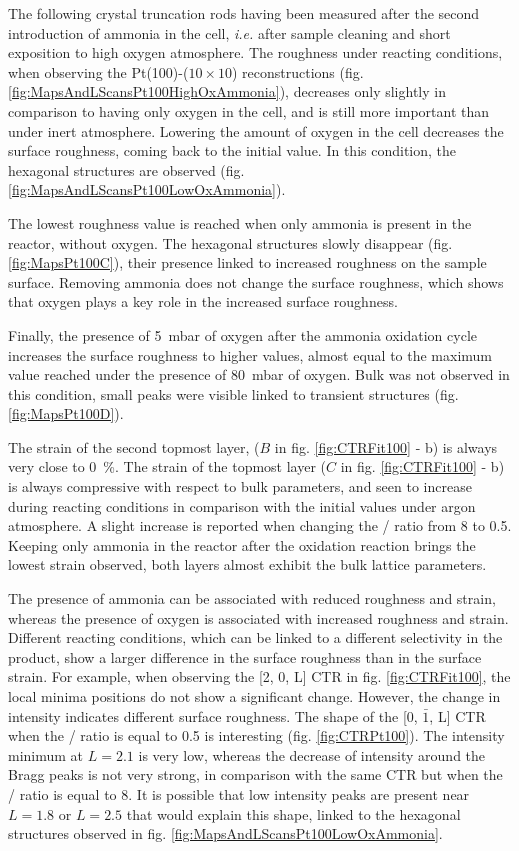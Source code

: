 The following crystal truncation rods having been measured after the second introduction of ammonia in the cell, \textit{i.e.} after sample cleaning and short exposition to high oxygen atmosphere.
The roughness under reacting conditions, when observing the Pt(100)-($10\times10$) reconstructions (fig. \ref{fig:MapsAndLScansPt100HighOxAmmonia}), decreases only slightly in comparison to having only oxygen in the cell, and is still more important than under inert atmosphere.
Lowering the amount of oxygen in the cell decreases the surface roughness, coming back to the initial value.
In this condition, the hexagonal structures are observed (fig. \ref{fig:MapsAndLScansPt100LowOxAmmonia}).

The lowest roughness value is reached when only ammonia is present in the reactor, without oxygen.
The hexagonal structures slowly disappear (fig. \ref{fig:MapsPt100C}), their presence linked to increased roughness on the sample surface.
Removing ammonia does not change the surface roughness, which shows that oxygen plays a key role in the increased surface roughness.

Finally, the presence of \qty{5}{\milli\bar} of oxygen after the ammonia oxidation cycle increases the surface roughness to higher values, almost equal to the maximum value reached under the presence of \qty{80}{\milli\bar} of oxygen.
Bulk  was not observed in this condition, small peaks were visible linked to transient structures (fig. \ref{fig:MapsPt100D}).

The strain of the second topmost layer, ($B$ in fig. \ref{fig:CTRFit100} - b) is always very close to \qty{0}{\percent}.
The strain of the topmost layer ($C$ in fig. \ref{fig:CTRFit100} - b) is always compressive with respect to bulk parameters, and seen to increase during reacting conditions in comparison with the initial values under argon atmosphere.
A slight increase is reported when changing the / ratio from \num{8} to \num{0.5}.
Keeping only ammonia in the reactor after the oxidation reaction brings the lowest strain observed, both layers almost exhibit the bulk lattice parameters.

The presence of ammonia can be associated with reduced roughness and strain, whereas the presence of oxygen is associated with increased roughness and strain.
Different reacting conditions, which can be linked to a different selectivity in the product, show a larger difference in the surface roughness than in the surface strain.
For example, when observing the [2, 0, L] CTR in fig. \ref{fig:CTRFit100}, the local minima positions do not show a significant change.
However, the change in intensity indicates different surface roughness.
The shape of the [0, $\bar{1}$, L] CTR when the / ratio is equal to \num{0.5} is interesting (fig. \ref{fig:CTRPt100}).
The intensity minimum at $L=2.1$ is very low, whereas the decrease of intensity around the Bragg peaks is not very strong, in comparison with the same CTR but when the / ratio is equal to \num{8}.
It is possible that low intensity peaks are present near $L=1.8$ or $L=2.5$ that would explain this shape, linked to the hexagonal structures observed in fig. \ref{fig:MapsAndLScansPt100LowOxAmmonia}.

